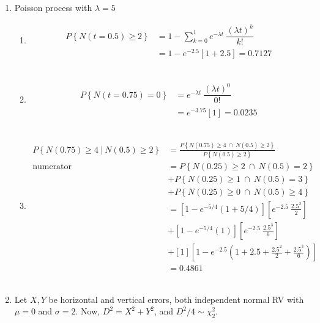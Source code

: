\begin{enumerate}
	
	\item Poisson process with $ \lambda = 5 $
			
		\begin{enumerate}
			\item
			\begin{align}
				P \left\{N(t = 0.5) \geq 2\right\} &= 1 - \sum\limits_{k=0}^{1} e^{-\lambda t}\ \dfrac{(\lambda t)^k}{k!} \nonumber \\
				&= 1 - e^{-2.5} \left[1 + 2.5\right]= 0.7127
			\end{align}\\
			
			\item
			\begin{align}
				P \left\{N(t = 0.75) = 0\right\} &= e^{-\lambda t}\ \dfrac{(\lambda t)^0}{0!} \nonumber \\
				&= e^{-3.75} \left[1\right]= 0.0235
			\end{align}\\
			
			\item
			\begin{align}
				P \left\{N(0.75) \geq 4\ |\ N(0.5) \geq 2\right\} &= \frac{P \left\{N(0.75) \geq 4\ \cap\ N(0.5) \geq 2\right\}}{P \left\{N(0.5) \geq 2\right\}} \nonumber \\
				\text{numerator}&= P \left\{N(0.25) \geq 2\ \cap\ N(0.5) = 2\right\} \nonumber \\
				&+ P \left\{N(0.25) \geq 1\ \cap\ N(0.5) = 3\right\} \nonumber \\ 
				&+ P\left\{N(0.25) \geq 0\ \cap\ N(0.5) \geq 4\right\} \\
				&= \left[1 - e^{-5/4}(1 + 5/4)\right] \left[e^{-2.5}\ \frac{2.5^2}{2}\right]  \nonumber \\
				&+ \left[1 - e^{-5/4}(1)\right] \left[e^{-2.5}\ \frac{2.5^3}{6}\right] \nonumber \\
				&+ \left[1\right] \left[1 - e^{-2.5}\left(1 + 2.5 + \frac{2.5^2}{2} + \frac{2.5^3}{6}\right)\right] \\
				&= 0.4861
			\end{align}\\
			
		\end{enumerate}
	
	
	\item Let $ X, Y $ be horizontal and vertical errors, both independent normal RV with  $ \mu = 0 $ and $ \sigma = 2 $. Now, $ D^2 = X^2 + Y^2 $, and  $D^2 / 4 \sim \chi_2^2 $.\\
			

\end{enumerate}
